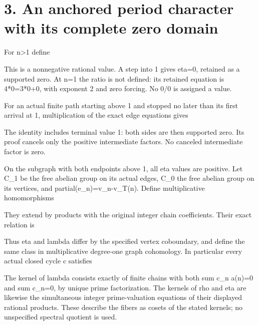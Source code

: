 \section{3. An anchored period character with its complete zero domain}

For n\textgreater1 define


This is a nonnegative rational value. A step into 1 gives eta=0,
retained as a supported zero. At n=1 the ratio is not defined: its
retained equation is 4*0=3*0+0, with exponent 2 and zero forcing. No 0/0
is assigned a value.

For an actual finite path starting above 1 and stopped no later than its
first arrival at 1, multiplication of the exact edge equations gives


The identity includes terminal value 1: both sides are then supported
zero. Its proof cancels only the positive intermediate factors. No
canceled intermediate factor is zero.

On the subgraph with both endpoints above 1, all eta values are
positive. Let C\_1 be the free abelian group on its actual edges, C\_0
the free abelian group on its vertices, and partial(e\_n)=v\_n-v\_T(n).
Define multiplicative homomorphisms


They extend by products with the original integer chain coefficients.
Their exact relation is


Thus eta and lambda differ by the specified vertex coboundary, and
define the same class in multiplicative degree-one graph cohomology. In
particular every actual closed cycle c satisfies


The kernel of lambda consists exactly of finite chains with both sum
c\_n a(n)=0 and sum c\_n=0, by unique prime factorization. The kernels
of rho and eta are likewise the simultaneous integer prime-valuation
equations of their displayed rational products. These describe the
fibers as cosets of the stated kernels; no unspecified spectral quotient
is used.

